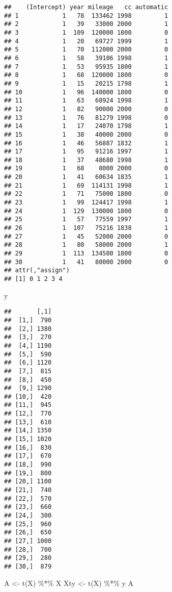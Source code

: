 \documentclass[
]{book}
\newenvironment{Shaded}{\begin{snugshade}}{\end{snugshade}}
\newcommand{\FunctionTok}[1]{\textcolor[rgb]{0.00,0.00,0.00}{#1}}
\newcommand{\NormalTok}[1]{#1}
\newcommand{\OtherTok}[1]{\textcolor[rgb]{0.56,0.35,0.01}{#1}}
\newcommand{\SpecialCharTok}[1]{\textcolor[rgb]{0.00,0.00,0.00}{#1}}
\begin{document}
\begin{verbatim}
##    (Intercept) year mileage   cc automatic
## 1            1   78  133462 1998         1
## 2            1   39   33000 2000         1
## 3            1  109  120000 1800         0
## 4            1   20   69727 1999         1
## 5            1   70  112000 2000         0
## 6            1   58   39106 1998         1
## 7            1   53   95935 1800         1
## 8            1   68  120000 1800         0
## 9            1   15   20215 1798         1
## 10           1   96  140000 1800         0
## 11           1   63   68924 1998         1
## 12           1   82   90000 2000         0
## 13           1   76   81279 1998         0
## 14           1   17   24070 1798         1
## 15           1   38   40000 2000         0
## 16           1   46   56887 1832         1
## 17           1   95   91216 1997         1
## 18           1   37   48680 1998         1
## 19           1   68    8000 2000         0
## 20           1   41   60634 1835         1
## 21           1   69  114131 1998         1
## 22           1   71   75000 1800         0
## 23           1   99  124417 1998         1
## 24           1  129  130000 1800         0
## 25           1   57   77559 1997         1
## 26           1  107   75216 1838         1
## 27           1   45   52000 2000         0
## 28           1   80   58000 2000         1
## 29           1  113  134500 1800         0
## 30           1   41   80000 2000         0
## attr(,"assign")
## [1] 0 1 2 3 4
\end{verbatim}

\begin{Shaded}
\begin{Highlighting}[]
\NormalTok{y}
\end{Highlighting}
\end{Shaded}

\begin{verbatim}
##       [,1]
##  [1,]  790
##  [2,] 1380
##  [3,]  270
##  [4,] 1190
##  [5,]  590
##  [6,] 1120
##  [7,]  815
##  [8,]  450
##  [9,] 1290
## [10,]  420
## [11,]  945
## [12,]  770
## [13,]  610
## [14,] 1350
## [15,] 1020
## [16,]  830
## [17,]  670
## [18,]  990
## [19,]  800
## [20,] 1100
## [21,]  740
## [22,]  570
## [23,]  660
## [24,]  300
## [25,]  960
## [26,]  650
## [27,] 1000
## [28,]  700
## [29,]  280
## [30,]  879
\end{verbatim}

\begin{Shaded}
\begin{Highlighting}[]
\NormalTok{A }\OtherTok{\textless{}{-}} \FunctionTok{t}\NormalTok{(X) }\SpecialCharTok{\%*\%}\NormalTok{ X}
\NormalTok{Xty }\OtherTok{\textless{}{-}} \FunctionTok{t}\NormalTok{(X) }\SpecialCharTok{\%*\%}\NormalTok{ y }
\NormalTok{A}
\end{Highlighting}
\end{Shaded}
\end{document}

